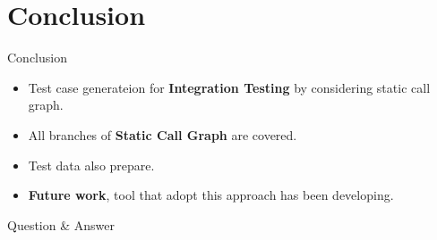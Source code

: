 \documentclass{beamer}
\begin{document}
%
\section{Conclusion}
\begin{frame}{Conclusion}
    \begin{itemize}
        \item Test case generateion for \textbf{Integration Testing} by considering static call graph.
        \item All branches of \textbf{Static Call Graph} are covered.
        \item Test data also prepare.
        \item \textbf{Future work}, tool that adopt this approach has been developing.
    \end{itemize}
\end{frame}

%
\begin{frame}
    \Large{Question \& Answer}
\end{frame}
\end{document}
